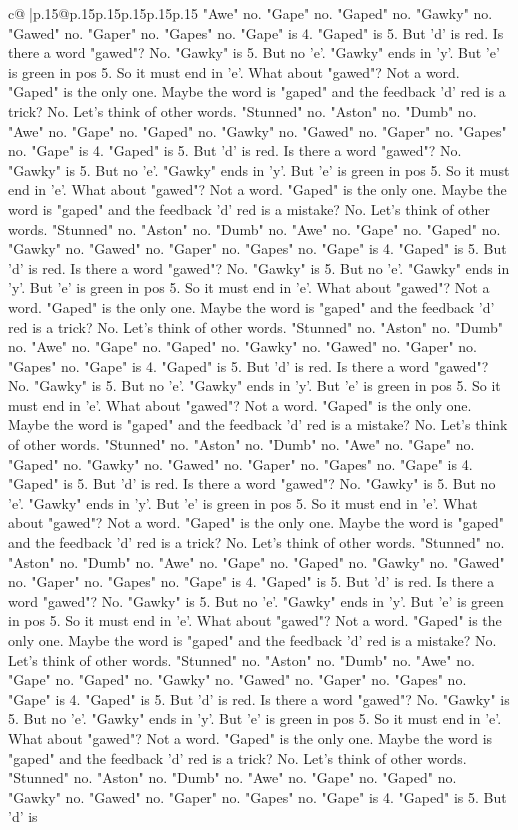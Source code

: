\documentclass{article}
\begin{document}
{\begin{supertabular}{c@{$\;$}|p{.15\linewidth}@{}p{.15\linewidth}p{.15\linewidth}p{.15\linewidth}p{.15\linewidth}p{.15\linewidth}}
{{{"Awe" no. "Gape" no. "Gaped" no. "Gawky" no. "Gawed" no. "Gaper" no. "Gapes" no. "Gape" is 4. "Gaped" is 5. But 'd' is red. Is there a word "gawed"? No. "Gawky" is 5. But no 'e'. "Gawky" ends in 'y'. But 'e' is green in pos 5. So it must end in 'e'. What about "gawed"? Not a word. "Gaped" is the only one. Maybe the word is "gaped" and the feedback 'd' red is a trick? No. Let's think of other words. "Stunned" no. "Aston" no. "Dumb" no. "Awe" no. "Gape" no. "Gaped" no. "Gawky" no. "Gawed" no. "Gaper" no. "Gapes" no. "Gape" is 4. "Gaped" is 5. But 'd' is red. Is there a word "gawed"? No. "Gawky" is 5. But no 'e'. "Gawky" ends in 'y'. But 'e' is green in pos 5. So it must end in 'e'. What about "gawed"? Not a word. "Gaped" is the only one. Maybe the word is "gaped" and the feedback 'd' red is a mistake? No. Let's think of other words. "Stunned" no. "Aston" no. "Dumb" no. "Awe" no. "Gape" no. "Gaped" no. "Gawky" no. "Gawed" no. "Gaper" no. "Gapes" no. "Gape" is 4. "Gaped" is 5. But 'd' is red. Is there a word "gawed"? No. "Gawky" is 5. But no 'e'. "Gawky" ends in 'y'. But 'e' is green in pos 5. So it must end in 'e'. What about "gawed"? Not a word. "Gaped" is the only one. Maybe the word is "gaped" and the feedback 'd' red is a trick? No. Let's think of other words. "Stunned" no. "Aston" no. "Dumb" no. "Awe" no. "Gape" no. "Gaped" no. "Gawky" no. "Gawed" no. "Gaper" no. "Gapes" no. "Gape" is 4. "Gaped" is 5. But 'd' is red. Is there a word "gawed"? No. "Gawky" is 5. But no 'e'. "Gawky" ends in 'y'. But 'e' is green in pos 5. So it must end in 'e'. What about "gawed"? Not a word. "Gaped" is the only one. Maybe the word is "gaped" and the feedback 'd' red is a mistake? No. Let's think of other words. "Stunned" no. "Aston" no. "Dumb" no. "Awe" no. "Gape" no. "Gaped" no. "Gawky" no. "Gawed" no. "Gaper" no. "Gapes" no. "Gape" is 4. "Gaped" is 5. But 'd' is red. Is there a word "gawed"? No. "Gawky" is 5. But no 'e'. "Gawky" ends in 'y'. But 'e' is green in pos 5. So it must end in 'e'. What about "gawed"? Not a word. "Gaped" is the only one. Maybe the word is "gaped" and the feedback 'd' red is a trick? No. Let's think of other words. "Stunned" no. "Aston" no. "Dumb" no. "Awe" no. "Gape" no. "Gaped" no. "Gawky" no. "Gawed" no. "Gaper" no. "Gapes" no. "Gape" is 4. "Gaped" is 5. But 'd' is red. Is there a word "gawed"? No. "Gawky" is 5. But no 'e'. "Gawky" ends in 'y'. But 'e' is green in pos 5. So it must end in 'e'. What about "gawed"? Not a word. "Gaped" is the only one. Maybe the word is "gaped" and the feedback 'd' red is a mistake? No. Let's think of other words. "Stunned" no. "Aston" no. "Dumb" no. "Awe" no. "Gape" no. "Gaped" no. "Gawky" no. "Gawed" no. "Gaper" no. "Gapes" no. "Gape" is 4. "Gaped" is 5. But 'd' is red. Is there a word "gawed"? No. "Gawky" is 5. But no 'e'. "Gawky" ends in 'y'. But 'e' is green in pos 5. So it must end in 'e'. What about "gawed"? Not a word. "Gaped" is the only one. Maybe the word is "gaped" and the feedback 'd' red is a trick? No. Let's think of other words. "Stunned" no. "Aston" no. "Dumb" no. "Awe" no. "Gape" no. "Gaped" no. "Gawky" no. "Gawed" no. "Gaper" no. "Gapes" no. "Gape" is 4. "Gaped" is 5. But 'd' is }}}
\end{supertabular}}
\end{document}
